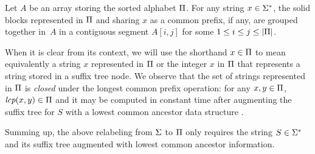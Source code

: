 \begin{lemma}
  \label{lemma:grouping}
  Let $A$ be an array storing the sorted alphabet $\Pi$. For any   string $x \in \Sigma^*$, the solid blocks represented in $\Pi$   and sharing $x$ as a common prefix, if any, are grouped together   in~$A$ in a contiguous segment $A[i,j]$ for some $1 \leq i \leq j   \leq |\Pi|$.
\end{lemma}


When it is clear from its context, we will use the shorthand $x \in \Pi$ to mean equivalently a string $x$ represented in $\Pi$ or the integer $x$ in $\Pi$ that represents a string stored in a suffix tree node.  We observe that the set of strings represented in $\Pi$ is \emph{closed} under the longest common prefix operation: for any $x, y \in \Pi$, $\operatorname{\textit{lcp}}(x, y) \in \Pi$ and it may be computed in constant time after augmenting the suffix tree for $S$ with a lowest common ancestor data structure \cite{harel1984fast}.

Summing up, the above relabeling from $\Sigma$ to $\Pi$ only requires the string $S \in \Sigma^*$ and its suffix tree augmented with lowest common ancestor information. 


